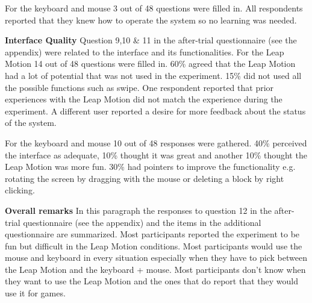 For the keyboard and mouse 3 out of 48 questions were filled in. All respondents reported that they knew how to operate the system so no learning was needed. \newline

\noindent\textbf{Interface Quality}\newline
Question 9,10 \& 11 in the after-trial questionnaire (see the appendix) were related to the interface and its functionalities. For the Leap Motion 14 out of 48 questions were 
filled in. 60\% agreed that the Leap Motion had a lot of potential that was not used in the experiment. 15\% did not used all the possible functions such as swipe. One respondent
 reported that prior experiences with the Leap Motion did not match the experience during the experiment. A different user reported a desire for more feedback about the status of
 the system. 

For the keyboard and mouse 10 out of 48 responses were gathered. 40\% perceived the interface as adequate, 10\% thought it was great and another 10\% thought the Leap Motion was 
more fun. 30\% had pointers to improve the functionality e.g. rotating the screen by dragging with the mouse or deleting a block by right clicking.\newline

\noindent\textbf{Overall remarks}\newline
In this paragraph the responses to question 12 in the after-trial questionnaire (see the appendix) and the items in the additional questionnaire are summarized. Most participants 
reported the experiment to be fun but difficult in the Leap Motion conditions. Most participants would use the mouse and keyboard in every situation especially when they have to 
pick between the Leap Motion and the keyboard + mouse. Most participants don’t know when they want to use the Leap Motion and the ones that do report that they would use it for 
games. \newline


